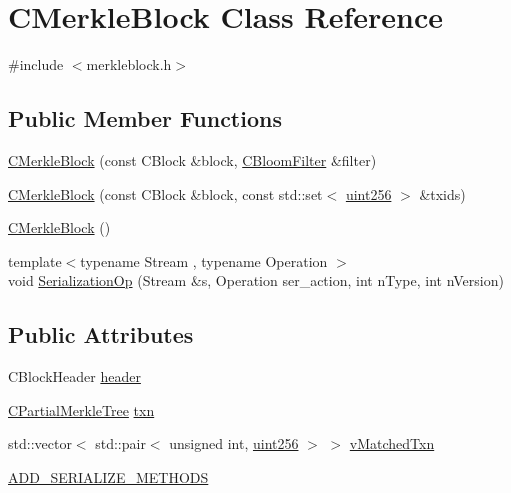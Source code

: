 \hypertarget{class_c_merkle_block}{}\section{C\+Merkle\+Block Class Reference}
\label{class_c_merkle_block}


{\ttfamily \#include $<$merkleblock.\+h$>$}

\subsection*{Public Member Functions}
\begin{DoxyCompactItemize}
\item 
\hyperlink{class_c_merkle_block_a5d08ce7034216ca25b0f9eab6bf8c389}{C\+Merkle\+Block} (const C\+Block \&block, \hyperlink{class_c_bloom_filter}{C\+Bloom\+Filter} \&filter)
\item 
\hyperlink{class_c_merkle_block_a720f9e78e80b415cf6b607b189eec31b}{C\+Merkle\+Block} (const C\+Block \&block, const std\+::set$<$ \hyperlink{classuint256}{uint256} $>$ \&txids)
\item 
\hyperlink{class_c_merkle_block_a0f02da9fc9fda85f7f292f2c2874ed39}{C\+Merkle\+Block} ()
\item 
{\footnotesize template$<$typename Stream , typename Operation $>$ }\\void \hyperlink{class_c_merkle_block_ab803bbe1d359d6b377adf75dc526da92}{Serialization\+Op} (Stream \&s, Operation ser\+\_\+action, int n\+Type, int n\+Version)
\end{DoxyCompactItemize}
\subsection*{Public Attributes}
\begin{DoxyCompactItemize}
\item 
C\+Block\+Header \hyperlink{class_c_merkle_block_a3c1fcef77eee1b476b3f3fd52055748a}{header}
\item 
\hyperlink{class_c_partial_merkle_tree}{C\+Partial\+Merkle\+Tree} \hyperlink{class_c_merkle_block_ac2174e9e8ea6e429328deb5a69a05558}{txn}
\item 
std\+::vector$<$ std\+::pair$<$ unsigned int, \hyperlink{classuint256}{uint256} $>$ $>$ \hyperlink{class_c_merkle_block_a73bbbdcb5d83588b15461c02d0228999}{v\+Matched\+Txn}
\item 
\hyperlink{class_c_merkle_block_aa57b1f8bfa7d3adb65dc71e479889194}{A\+D\+D\+\_\+\+S\+E\+R\+I\+A\+L\+I\+Z\+E\+\_\+\+M\+E\+T\+H\+O\+D\+S}
\end{DoxyCompactItemize}


